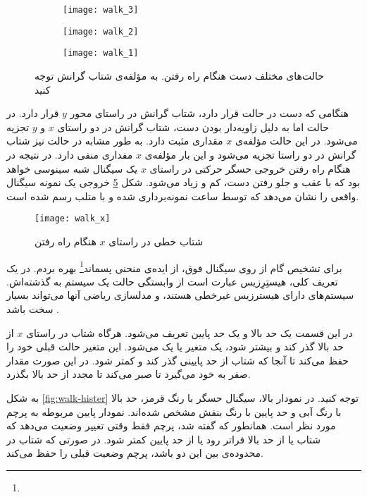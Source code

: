 \begin{figure}[h]
	\centering
	\begin{subfigure}{0.32\textwidth}
		\centering
		\texttt{[image: walk\_3]}
		\caption{}
		\label{fig:walk-3}
	\end{subfigure}
	\begin{subfigure}{0.3\textwidth}
		\centering
		\texttt{[image: walk\_2]}
		\caption{}
		\label{fig:walk-2}
	\end{subfigure}
	\begin{subfigure}{0.3\textwidth}
		\centering
		\texttt{[image: walk\_1]}
		\caption{}
		\label{fig:walk-1}
	\end{subfigure}
	\caption{حالت‌های مختلف دست هنگام راه رفتن. به مؤلفه‌ی  شتاب گرانش توجه کنید}
	\label{fig:walk}
\end{figure}
\newpage
هنگامی که دست در حالت  قرار دارد، شتاب گرانش در راستای محور $y$ قرار دارد. در حالت  اما به دلیل زاویه‌دار بودن دست، شتاب گرانش در دو راستای $x$ و $y$ تجزیه می‌شود. در این حالت مؤلفه‌ی $x$ مقداری مثبت دارد. به طور مشابه در حالت  نیز شتاب گرانش در دو راستا تجزیه می‌شود و این بار مؤلفه‌ی $x$ مفداری منفی دارد. در نتیجه در هنگام راه رفتن خروجی حسگر حرکتی در راستای $x$ یک سیگنال شبه سینوسی خواهد بود که با عقب و جلو رفتن دست، کم و زیاد می‌شود. شکل \ref{fig:walk-x} خروجی یک نمونه سیگنال واقعی را نشان می‌دهد که توسط ساعت نمونه‌برداری شده و با متلب رسم شده است.

\begin{figure}[h]
	\centering
	\texttt{[image: walk\_x]}
	\caption{شتاب خطی در راستای $x$ هنگام راه رفتن}
	\label{fig:walk-x}
\end{figure}

برای تشخیص گام از روی سیگنال فوق، از ایده‌ی منحنی پسماند\footnote{} بهره بردم. در یک تعریف کلی، هیستِرِزیس عبارت است از وابستگی حالت یک سیستم به گذشته‌اش. سیستم‌های دارای هیسترزیس غیرخطی هستند، و مدلسازی ریاضی آنها می‌تواند بسیار سخت باشد \cite{hister}.

در این قسمت یک حد بالا و یک حد پایین تعریف می‌شود. هرگاه شتاب در راستای $x$ از حد بالا گذر کند و بیشتر شود، یک متغیر یا  یک می‌شود. این متغیر حالت قبلی خود را حفظ می‌کند تا آنجا که شتاب از حد پایینی گذر کند و کمتر شود. در این صورت مقدار صفر به خود می‌گیرد تا صبر می‌کند تا مجدد از حد بالا بگذرد.

به شکل \ref{fig:walk-hister} توجه کنید. در نمودار بالا، سیگنال حسگر با رنگ قرمز، حد بالا با رنگ آبی و حد پایین با رنگ بنفش مشخص شده‌اند. نمودار پایین مربوطه به پرچم مورد نظر است. همانطور که گفته شد، پرچم فقط وقتی تغییر وضعیت می‌دهد که شتاب یا از حد بالا فراتر رود یا از حد پایین کمتر شود. در صورتی که شتاب در محدوده‌ی بین این دو باشد، پرچم وضعیت قبلی را حفظ می‌کند.

